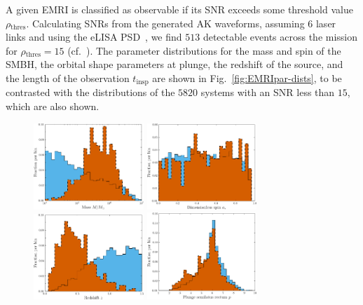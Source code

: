 \documentclass[aps,prd,amsfonts,amssymb,amsmath,nofootinbib,showpacs,superscriptaddress,twocolumn,floatfix]{revtex4-1}
\newcommand{\figref}[1]{Fig.~\ref{fig:#1}}
\newcommand{\sub}[1]{\ensuremath{_\mathrm{#1}}}
\begin{document}
A given EMRI is classified as observable if its SNR exceeds some threshold value $\rho\sub{thres}$. Calculating SNRs from the generated AK waveforms, assuming $6$ laser links and using the eLISA PSD~\cite{Amaro-Seoane2012a}, we find $513$ detectable events across the mission for $\rho\sub{thres} = 15$ (cf.\ \cite{Gair2004,Amaro-Seoane2012a,Mapelli2012}). The parameter distributions for the mass and spin of the SMBH, the orbital shape parameters at plunge, the redshift of the source, and the length of the observation $t\sub{insp}$ are shown in \figref{EMRIpar-dists}, to be contrasted with the distributions of the $5820$ systems with an SNR less than $15$, which are also shown.%

\begin{figure}
\centering
\includegraphics[width=0.37\textwidth]{Fig_res_pop_M} \quad
\includegraphics[width=0.37\textwidth]{Fig_res_pop_a} \\ \vspace{0.1cm}
\includegraphics[width=0.37\textwidth]{Fig_res_pop_z} \quad
\includegraphics[width=0.37\textwidth]{Fig_res_pop_p} \\ \vspace{0.1cm}

\end{figure}
\end{document}
